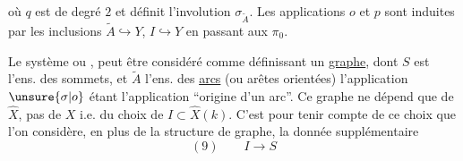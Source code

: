 où $q$ est de degré $2$ et définit l'involution $\sigma_{\widetilde A}$. Les applications $o$ et $p$ sont induites par les inclusions $\widetilde A\hookrightarrow Y$, $I\hookrightarrow Y$ en passant aux $\pi_0$.

Le système
ou
, peut être considéré comme définissant un \uline{graphe}, dont $S$ est l'ens. des sommets, et $\widetilde A$ l'ens. des \uline{arcs} (ou arêtes orientées) l'application $\unsure{\sigma|o}$ étant l'application ``origine d'un arc''. Ce graphe ne dépend que de $\widehat X$, pas de $X$ i.e. du choix de $I\subset\widehat X(k)$. C'est pour tenir compte de ce choix que l'on considère, en plus de la structure de graphe, la donnée supplémentaire
\[
(9)\qquad I\longrightarrow S
\]

